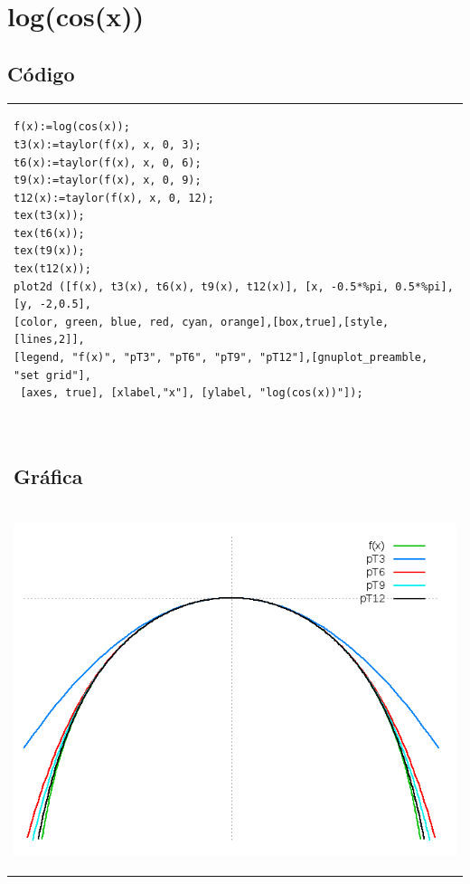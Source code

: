 \documentclass[10pt]{article}
\begin{document}
\section{log(cos(x))}


\subsection{Código}
\begin{tabular}{l}
\begin{verbatim}  
f(x):=log(cos(x));
t3(x):=taylor(f(x), x, 0, 3);
t6(x):=taylor(f(x), x, 0, 6);
t9(x):=taylor(f(x), x, 0, 9);
t12(x):=taylor(f(x), x, 0, 12);
tex(t3(x));
tex(t6(x));
tex(t9(x));
tex(t12(x));
plot2d ([f(x), t3(x), t6(x), t9(x), t12(x)], [x, -0.5*%pi, 0.5*%pi], [y, -2,0.5],
[color, green, blue, red, cyan, orange],[box,true],[style,[lines,2]],
[legend, "f(x)", "pT3", "pT6", "pT9", "pT12"],[gnuplot_preamble, "set grid"],
 [axes, true], [xlabel,"x"], [ylabel, "log(cos(x))"]);


\end{verbatim} \\
\subsection{Gráfica}\\
\begin{center}
  
    \includegraphics[scale=0.4]{logcos}
\end{center}
\end{tabular}
\end{document}

